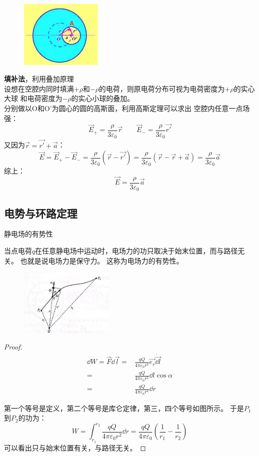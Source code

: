 \documentclass[cn,hazy,blue,14pt,normal]{elegantnote}
\numberwithin{equation}{section}
\begin{document}
\begin{figure}
  \includegraphics[width=0.35\textwidth]{image/example1.2.pdf}
\end{figure}

\noindent
\textbf{填补法}，利用叠加原理\\
设想在空腔内同时填满$+\rho$和$-\rho$的电荷，则原电荷分布可视为电荷密度为$+\rho$的实心大球
和电荷密度为$-\rho$的实心小球的叠加。\\
分别做以O和O'为圆心的圆的高斯面，利用高斯定理可以求出
空腔内任意一点场强：
$$
\vec{E}_+=\frac{\rho}{3\varepsilon_0}\vec{r}\qquad\vec{E}_-=\frac{\rho}{3\varepsilon_0}\vec{r'}
$$
又因为$\vec{r}=\vec{r'}+\vec{a}$：
$$
\vec{E}=\vec{E}_+-\vec{E}_-=\frac{\rho}{3\varepsilon_0}(\vec{r}-\vec{r'})
=\frac{\rho}{3\varepsilon_0}(\vec{r}-\vec{r}+\vec{a})=\frac{\rho}{3\varepsilon_0}\vec{a}
$$
综上：
$$\vec{E}=\frac{\rho}{3\varepsilon_0}\vec{a}$$

\subsection{电势与环路定理}
\begin{theorem}
    静电场的有势性
\end{theorem}
当点电荷$q$在任意静电场中运动时，电场力的功只取决于始末位置，而与路径无关。
也就是说电场力是保守力。
这称为电场力的有势性。
\begin{figure}
    \includegraphics[width=0.4\textwidth]{image/T1_3.jpg}
\end{figure}
\begin{proof}

    \begin{align*}
        \dd W = \vec{F}\dot\dd\vec{l} =& \frac{qQ}{4\pi\varepsilon_0r^2}\vec{e_r}\dot\vec{\dd l}\\
        =& \frac{qQ}{4\pi\varepsilon_0r^2}\dd l \cos \alpha \\
        =& \frac{qQ}{4\pi\varepsilon_0r^2} \dd r
    \end{align*}

第一个等号是定义，第二个等号是库仑定律，第三，四个等号如图所示。
于是$P_1$到$P_2$的功为：
$$
W = \int_{r_1}^{r_2}\frac{qQ}{4\pi\varepsilon_0r^2}\dd r = \frac{qQ}{4\pi\varepsilon_0}(\frac{1}{r_1}-\frac{1}{r_2})
$$
可以看出只与始末位置有关，与路径无关。
\end{proof}
\end{document}
